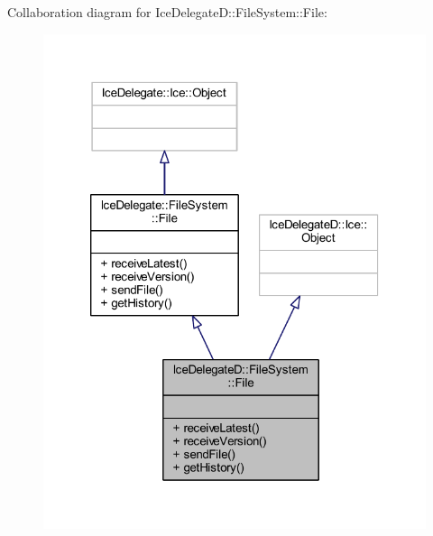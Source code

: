 Collaboration diagram for Ice\+Delegate\+D\+:\+:File\+System\+:\+:File\+:
\nopagebreak
\begin{figure}[H]
\begin{center}
\leavevmode
\includegraphics[width=320pt]{class_ice_delegate_d_1_1_file_system_1_1_file__coll__graph}
\end{center}
\end{figure}
